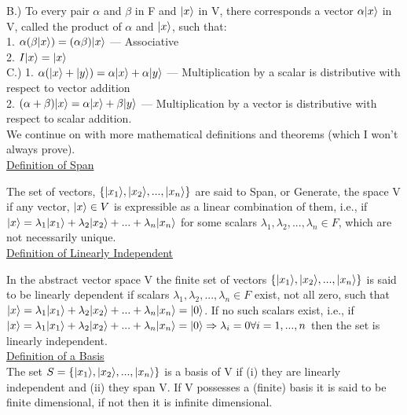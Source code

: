B.) To every pair $\alpha$ and $\beta$ in F and $|x\rangle$ in V, there corresponds a vector $\alpha|x\rangle$ in V, 
called the product of $\alpha$ and $|x\rangle$, such that:\\

1. $\alpha(\beta|x\rangle) = (\alpha\beta)|x\rangle$ --- Associative\\
2. $I|x\rangle = |x\rangle$\\ 

C.) 1. $\alpha(|x\rangle + |y\rangle) = \alpha|x\rangle +\alpha|y\rangle $ --- Multiplication by a scalar 
is distributive with respect to vector addition\\

2. $(\alpha + \beta)|x\rangle = \alpha|x\rangle + \beta|y\rangle$ --- Multiplication by a vector is distributive with 
respect to scalar addition. \\

We continue on with more mathematical definitions and theorems (which I won't always prove).\\

\underline{Definition of Span}

The set of vectors, $\{|x_1\rangle,|x_2\rangle,...,|x_n\rangle\}$ are said to Span, or Generate, the space V if any vector,
$|x\rangle \in V$ is expressible as a linear combination of them, i.e., if $|x\rangle = \lambda_1|x_1\rangle + 
\lambda_2|x_2\rangle +...+ \lambda_n|x_n\rangle$ for some scalars $\lambda_1, \lambda_2,...,\lambda_n \in F$, which are
not necessarily unique.\\

\underline{Definition of Linearly Independent}

In the abstract vector space V the finite set of vectors $\{|x_1\rangle,|x_2\rangle,...,|x_n\rangle\}$ is said to be 
linearly dependent if scalars $\lambda_1, \lambda_2,...,\lambda_n \in F$ exist, not all zero, such that
$|x\rangle = \lambda_1|x_1\rangle + \lambda_2|x_2\rangle +...+ \lambda_n|x_n\rangle = |0\rangle$. If no such scalars exist, 
i.e., if $|x\rangle = \lambda_1|x_1\rangle + \lambda_2|x_2\rangle +...+ \lambda_n|x_n\rangle = |0\rangle \Rightarrow 
\lambda_i = 0 \forall i = 1, ..., n$ then the set is linearly independent.\\

\underline{Definition of a Basis}\\

The set $S = \{|x_1\rangle,|x_2\rangle,...,|x_n\rangle\}$ is a basis of V if (i) they are linearly 
independent and (ii) they span V. If V possesses a (finite) basis it is said to be finite dimensional, 
if not then it is infinite dimensional.


